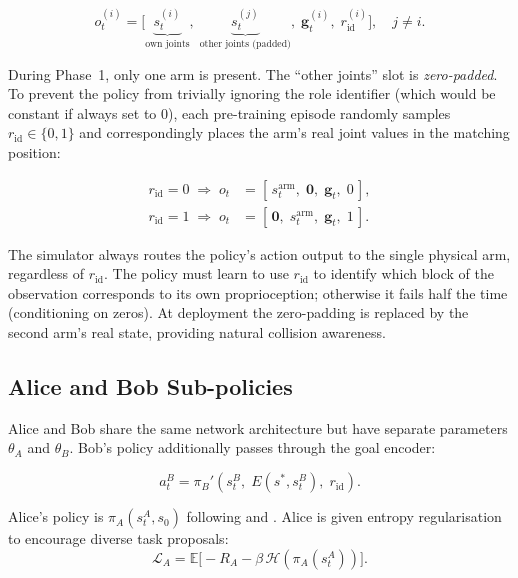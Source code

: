 \documentclass[12pt, a4paper]{article}
\newcommand{\piA}{\pi_A}
\newcommand{\piB}{\pi_B}
\newcommand{\sstar}{s^{*}}
\newcommand{\Enc}{E}
\newcommand{\goalvec}{\mathbf{g}}
\newcommand{\calL}{\mathcal{L}}
\begin{document}
\begin{equation}
    o_t^{(i)} = \bigl[\underbrace{s_t^{(i)}}_{\text{own joints}},\;
                       \underbrace{s_t^{(j)}}_{\text{other joints (padded)}},\;
                       \goalvec_t^{(i)},\;
                       r_{\mathrm{id}}^{(i)}\bigr],
    \quad j \neq i. \label{eq:obs}
\end{equation}

During Phase~1, only one arm is present. The ``other joints'' slot is \emph{zero-padded}.
To prevent the policy from trivially ignoring the role identifier (which would be constant
if always set to 0), each pre-training episode randomly samples $r_{\mathrm{id}} \in \{0,1\}$
and correspondingly places the arm's real joint values in the matching position:

\begin{align}
    r_{\mathrm{id}} = 0 \;\Rightarrow\; o_t &= [\,s_t^{\text{arm}},\; \mathbf{0},\; \goalvec_t,\; 0\,], \label{eq:rid0}\\
    r_{\mathrm{id}} = 1 \;\Rightarrow\; o_t &= [\,\mathbf{0},\; s_t^{\text{arm}},\; \goalvec_t,\; 1\,]. \label{eq:rid1}
\end{align}

The simulator always routes the policy's action output to the single physical arm, regardless
of $r_{\mathrm{id}}$. The policy must learn to use $r_{\mathrm{id}}$ to identify which block
of the observation corresponds to its own proprioception; otherwise it fails half the time
(conditioning on zeros). At deployment the zero-padding is replaced by the second arm's real
state, providing natural collision awareness.

\subsection{Alice and Bob Sub-policies}
\label{subsec:phase1_policies}

Alice and Bob share the same network architecture but have separate parameters
$\theta_A$ and $\theta_B$. Bob's policy additionally passes through the goal encoder:

\begin{equation}
    a_t^B = \piB'(s_t^B,\; \Enc(\sstar, s_t^B),\; r_{\mathrm{id}}).
\end{equation}

Alice's policy is $\piA(s_t^A, s_0)$ following \citet{sukhbaatar2018intrinsic} and
\citet{sukhbaatar2018learning}. Alice is given entropy regularisation to encourage
diverse task proposals:
\begin{equation}
    \calL_A = \mathbb{E}\bigl[-R_A - \beta\, \mathcal{H}(\piA(s_t^A))\bigr]. \label{eq:alice_loss}
\end{equation}
\end{document}
